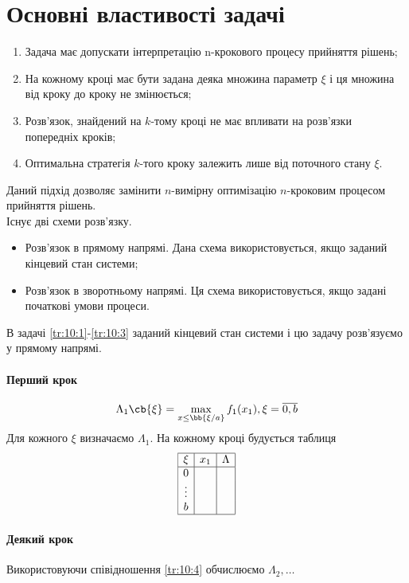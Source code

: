 \section{Основні властивості задачі}
\begin{enumerate}
	\item Задача має допускати інтерпретацію n-крокового процесу прийняття рішень;
	\item На кожному кроці має бути задана деяка множина параметр $\xi$ і ця множина від кроку до кроку не змінюється;
	\item Розв’язок, знайдений на $k$-тому кроці не має впливати на розв’язки попередніх кроків;
	\item Оптимальна стратегія $k$-того кроку залежить лише від поточного стану $\xi$.
\end{enumerate}
Даний підхід дозволяє замінити $n$-вимірну оптимізацію $n$-кроковим процесом прийняття рішень.\\
Існує дві схеми розв’язку. 
\begin{itemize}
	\item Розв’язок в прямому напрямі. Дана схема використовується, якщо заданий кінцевий стан системи;
	\item Розв’язок в зворотньому напрямі. Ця схема використовується, якщо задані початкові умови процеси.
\end{itemize}
В задачі \eqref{tr:10:1}-\eqref{tr:10:3} заданий кінцевий стан системи і цю задачу розв’язуємо у прямому напрямі.
\paragraph{Перший крок}
\begin{equation}
	\Lambda_1\cb{\xi} = \max\limits_{x\leq \bb{\xi/a}} f_1(x_1),\xi = \overline{0,b}
\end{equation}
Для кожного $\xi$ визначаємо $\Lambda_1$. На кожному кроці будується таблиця
\begin{equation*}
\begin{array}{|c|c|c|}
	\hline
	\xi & x_1 & \Lambda\\\hline
	0 && \\
	\vdots && \\
	b && \\\hline
\end{array}
\end{equation*}
\paragraph{Деякий крок}
Використовуючи співідношення \eqref{tr:10:4} обчислюємо $\Lambda_2,\ldots$
